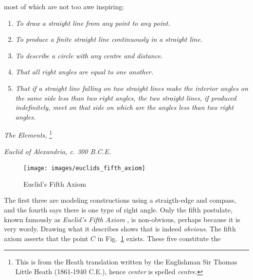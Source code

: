         most of which are not too awe inspiring:
        \begin{center}
            \begin{enumerate}
                \item \textit{To draw a straight line from any point}
                      \textit{to any point.}
                \item \textit{To produce a finite straight line continuously in}
                      \textit{a straight line.}
                \item \textit{To describe a circle with any centre and}
                      \textit{distance.}
                \item \textit{That all right angles are equal to one another.}
                \item \textit{That if a straight line falling on two straight}
                      \textit{lines make the interior angles on the same side}
                      \textit{less than two right angles, the two straight}
                      \textit{lines, if produced indefinitely, meet on that}
                      \textit{side on which are the angles less than two right}
                      \textit{angles.}
            \end{enumerate}
            \hfill\textit{The Elements,}%
            \footnote{%
                This is from the Heath translation written by the Englishman
                Sir Thomas Little Heath
                (1861-1940 C.E.), hence \textit{center} is spelled
                \textit{centre}.
            }\par
            \hfill\textit{Euclid of Alexandria, c. 300 B.C.E.}
        \end{center}
        \begin{figure}
            \centering
            \captionsetup{type=figure}
            \texttt{[image: images/euclids\_fifth\_axiom]}
            \caption{Euclid's Fifth Axiom}
            \label{fig:Euclids_Fifth_Axiom}
        \end{figure}
        The first three are modeling constructions using a straigth-edge and
        compass, and the fourth says there is one type of right angle. Only the
        fifth postulate, known famously as \textit{Euclid's Fifth Axiom}%
        , is non-obvious, perhaps because it is very
        wordy. Drawing what it describes shows that is indeed \textit{obvious}.
        The fifth axiom asserts that the point $C$ in
        Fig.~\ref{fig:Euclids_Fifth_Axiom} exists. These five constitute the
